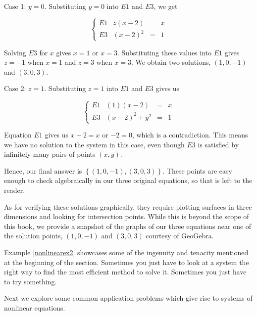 \documentclass{ximera}
\begin{document}
\begin{example}
\begin{explanation}
\begin{enumerate}
{ \sc Case 1: $y = 0$. }  Substituting $y=0$ into $E1$ and $E3$, we get 

\[\left\{\begin{array}{lrcl}   E1 & z(x-2) & = & x \\ E3 & (x-2)^2 & = & 1 \end{array} \right.\]

Solving $E3$ for $x$ gives $x = 1$ or $x=3$.  Substituting these values into $E1$ gives $z=-1$ when $x=1$ and $z = 3$ when $x=3$.  We obtain two solutions, $(1,0,-1)$ and $(3,0,3)$.

{ \sc Case 2:  $z = 1$. }  Substituting $z=1$ into $E1$ and $E3$ gives us 


\[\left\{\begin{array}{lrcl}   E1 & (1)(x-2) & = & x  \\ E3 & (x-2)^2+y^2 & = & 1 \end{array} \right.\]

Equation $E1$ gives us $x-2 = x$ or $-2 = 0$, which is a contradiction.  This means we have no solution to the system in this case, even though $E3$ is satisfied by infinitely many pairs of points $(x,y)$.  

Hence, our final answer is $\left\{ (1,0,-1), (3,0,3) \right\}$.  These points are easy enough to check algebraically in our three original equations, so that is left to the reader.  

As for verifying these solutions graphically, they require plotting surfaces in three dimensions and looking for intersection points.  While this is beyond the scope of this book, we provide a snapshot of the graphs of our three equations near one of the solution points,  $(1,0,-1)$ and $(3,0,3)$ courtesy of GeoGebra. 

\begin{center}
\end{center}
\end{enumerate}

\end{explanation}
\end{example}

Example \ref{nonlinearex2} showcases some of the ingenuity and tenacity mentioned at the beginning of the section.  Sometimes you just have to look at a system the right way to find the most efficient method to solve it.  Sometimes you just have to try something.  

Next we explore some common application problems which give rise to systems of nonlinear equations.
\end{document}
